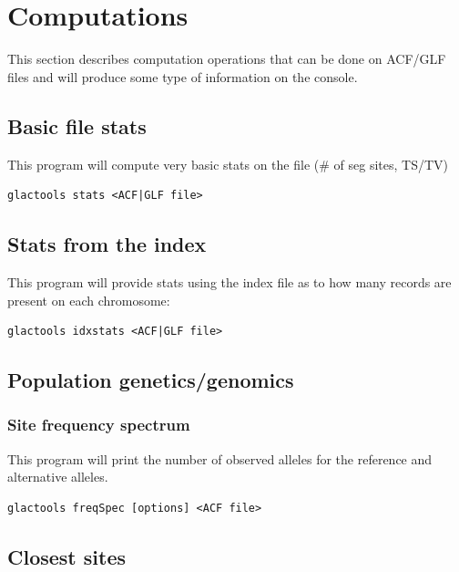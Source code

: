 \documentclass[a4paper]{article}
\begin{document}
\newpage

\section{Computations}

This section describes computation operations that can be done on ACF/GLF files and will produce some type of information on the console.



\subsection{Basic file stats}

 This program will compute very basic stats on the file (\# of seg sites, TS/TV)

\begin{lstlisting}
glactools stats <ACF|GLF file>
\end{lstlisting}


\subsection{Stats from the index}

\noindent This program will provide stats using the index file as to how many records are present on each chromosome:

\begin{lstlisting}
glactools idxstats <ACF|GLF file>
\end{lstlisting}


\subsection{Population genetics/genomics}

\subsubsection{Site frequency spectrum}

This program will print the number of observed alleles for the reference and alternative alleles.

\begin{lstlisting}
glactools freqSpec [options] <ACF file>
\end{lstlisting}

\subsection{Closest sites}
\end{document}
